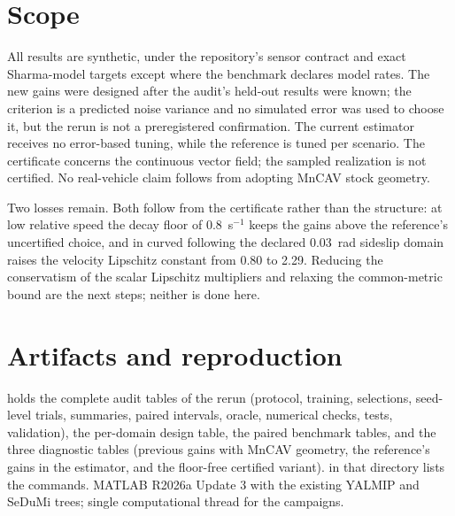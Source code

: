 \documentclass[11pt]{article}
\begin{document}
\section{Scope}
All results are synthetic, under the repository's sensor contract and exact
Sharma-model targets except where the benchmark declares model rates. The
new gains were designed after the audit's held-out results were known; the
criterion is a predicted noise variance and no simulated error was used to
choose it, but the rerun is not a preregistered confirmation. The current
estimator receives no error-based tuning, while the reference is tuned per
scenario. The certificate concerns the continuous vector field; the sampled
realization is not certified. No real-vehicle claim follows from adopting
MnCAV stock geometry.

Two losses remain. Both follow from the certificate rather than the
structure: at low relative speed the decay floor of 0.8~s$^{-1}$ keeps the
gains above the reference's uncertified choice, and in curved following the
declared 0.03~rad sideslip domain raises the velocity Lipschitz constant
from 0.80 to 2.29. Reducing the conservatism of the scalar Lipschitz
multipliers and relaxing the common-metric bound are the next steps; neither
is done here.

\section{Artifacts and reproduction}
 holds the complete audit
tables of the rerun (protocol, training, selections, seed-level trials,
summaries, paired intervals, oracle, numerical checks, tests, validation), the
per-domain design table, the paired benchmark tables, and the three
diagnostic tables (previous gains with MnCAV geometry, the reference's gains
in the estimator, and the floor-free certified variant).
 in that directory lists the commands. MATLAB R2026a
Update 3 with the existing YALMIP and SeDuMi trees; single computational
thread for the campaigns.
\end{document}
